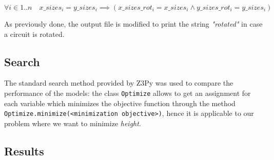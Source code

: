 \begin{equation*}
     \forall i \in {1..n} \quad x\_sizes_i = y\_sizes_i \implies (x\_sizes\_rot_i = x\_sizes_i \land y\_sizes\_rot_i = y\_sizes_i)
\end{equation*}

As previously done, the output file is modified to print the string \textit{"rotated"} in case a circuit is rotated. 

\subsection{Search}

The standard search method provided by Z3Py was used to compare the performance of the models: the class \verb|Optimize| allows to get an assignment for each variable which minimizes the objective function through the method \verb|Optimize.minimize(<minimization objective>)|, hence it is applicable to our problem where we want to minimize \textit{height}.

\subsection{Results}


